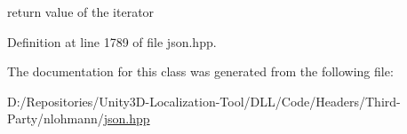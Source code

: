 return value of the iterator 



Definition at line 1789 of file json.\+hpp.



The documentation for this class was generated from the following file\+:\begin{DoxyCompactItemize}
\item 
D\+:/\+Repositories/\+Unity3\+D-\/\+Localization-\/\+Tool/\+D\+L\+L/\+Code/\+Headers/\+Third-\/\+Party/nlohmann/\mbox{\hyperlink{json_8hpp}{json.\+hpp}}\end{DoxyCompactItemize}
